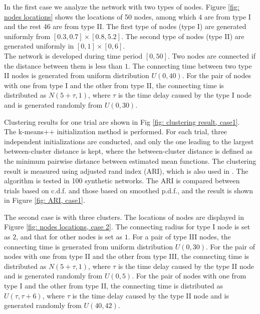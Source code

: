 In the first case we analyze the network with two types of nodes.
Figure \ref{fig: nodes locations} shows the locations of 50 nodes, among which 4 are from type I and the rest 46 are from type II.
The first type of nodes (type I) are generated uniformly from $[0.3, 0.7]\times[0.8, 5.2]$.
The second type of nodes (type II) are generated uniformly in $[0,1]\times[0,6]$. 
\\

\noindent
The network is developed during time period $[0,50]$.
Two nodes are connected if the distance between them is less than $1$.
The connecting time between two type II nodes is generated from uniform distribution $U(0,40)$.
For the pair of nodes with one from type I and the other from type II, the connecting time is distributed as $N(5+\tau,1)$, where $\tau$ is the time delay caused by the type I node and is generated randomly from $U(0,30)$.

\noindent
Clustering results for one trial are shown in Fig \ref{fig: clustering result, case1}.
\\


\noindent
The k-means++ initialization method is performed. 
For each trial, three independent initializations are conducted, and only the one leading to the largest 
between-cluster distance
is kept, where the between-cluster distance is defined as the minimum pairwise distance between estimated mean  functions.
The clustering result is measured using adjusted rand index (ARI), which is also used in \cite{Matias2018}.
The algorithm is tested in 100 synthetic networks. 
The ARI is compared between trials based on c.d.f. and those based on smoothed p.d.f.,
and the result is shown in Figure \ref{fig: ARI, case1}.



The second case is with three clusters.
The locations of nodes are displayed in Figure \ref{fig: nodes locations, case 2}.
The connecting radius for type I node is set as $2$, and that for other nodes is set as $1$. 
For a pair of type III nodes, the connecting time is generated from uniform distribution $U(0,30)$.
For the pair of nodes with one from type II and the other from type III, 
the connecting time is distributed as $N(5+\tau,1)$, where $\tau$ is the time delay caused by the type II node and is generated randomly from $U(0,5)$.
For the pair of nodes with one from type I and the other from type II, the connecting time is distributed as $U(\tau,\tau+6)$, where $\tau$ is the time delay caused by the type II node and is generated randomly from $U(40,42)$.




